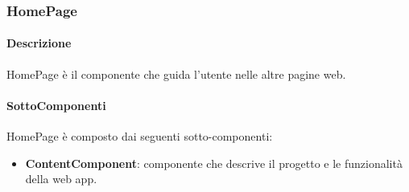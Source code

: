 \subsubsection{HomePage}
\paragraph{Descrizione}
HomePage è il componente che guida l'utente nelle altre pagine web.
\paragraph{SottoComponenti}
HomePage è composto dai seguenti sotto-componenti:
\begin{itemize}
    \item \textbf{ContentComponent}: componente che descrive il progetto e le funzionalità della web app.
\end{itemize}